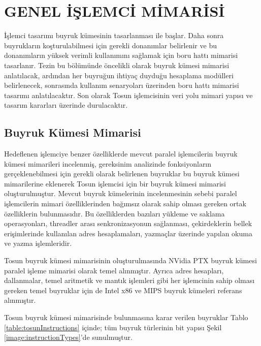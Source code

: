 \chapter{GENEL İŞLEMCİ MİMARİSİ}
İşlemci tasarımı buyruk kümesinin tasarlanması ile başlar. Daha sonra buyrukların koşturulabilmesi için gerekli donanımlar belirlenir ve bu donanımların yüksek verimli kullanımını sağlamak için boru hattı mimarisi tasarlanır. Tezin bu bölümünde öncelikli olarak buyruk kümesi mimarisi anlatılacak, ardından her buyruğun ihtiyaç duyduğu hesaplama modülleri belirlenecek, sonrasında kullanım senaryoları üzerinden boru hattı mimarisi tasarımı anlatılacaktır. Son olarak Tosun işlemcisinin veri yolu mimari yapısı ve tasarım kararları üzerinde durulacaktır.\par

\section{Buyruk Kümesi Mimarisi}
Hedeflenen işlemciye benzer özelliklerde mevcut paralel işlemcilerin buyruk kümesi mimarileri incelenmiş, gereksinim analizinde fonksiyonların gerçeklenebilmesi için gerekli olarak belirlenen buyruklar bu buyruk kümesi mimarilerine eklenerek Tosun işlemcisi için bir buyruk kümesi mimarisi oluşturulmuştur. Mevcut buyruk kümelerinin incelenmesinin sebebi paralel işlemcilerin mimari özelliklerinden bağımsız olarak sahip olması gereken ortak özelliklerin bulunmasıdır. Bu özelliklerden bazıları yükleme ve saklama operasyonları, threadler arası senkronizasyonun sağlanması, çekirdeklerin bellek erişimlerinde kullanılan adres hesaplamaları, yazmaçlar üzerinde yapılan okuma ve yazma işlemleridir. \par

Tosun buyruk kümesi mimarisinin oluşturulmasında NVidia PTX \cite{nvidiaPTXISA} buyruk kümesi paralel işleme mimarisi olarak temel alınmıştır. Ayrıca adres hesapları, dallanmalar, temel aritmetik ve mantık işlemleri gibi her işlemcinin sahip olması gereken temel buyruklar için de Intel x86 \cite{x86ISA} ve MIPS \cite{MIPSISA} buyruk kümeleri referans alınmıştır. \par

Tosun buyruk kümesi mimarisinde bulunmasına karar verilen buyruklar Tablo \ref{table:tosunInstructions} içinde; tüm buyruk türlerinin bit yapısı Şekil \ref{image:instructionTypes}'de sunulmuştur. 




